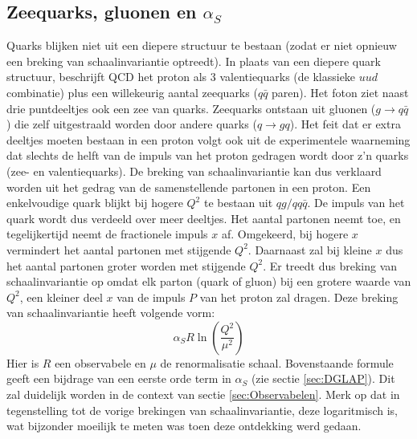 \documentclass[a4paper,11pt]{article}
\numberwithin{equation}{section} %
\begin{document}
  \subsection{Zeequarks, gluonen en $\alpha_S$}
Quarks blijken niet uit een diepere structuur te bestaan (zodat er niet opnieuw een breking van schaalinvariantie optreedt).
In plaats van een diepere quark structuur, beschrijft QCD het proton als 3 valentiequarks (de klassieke $u u d$ combinatie) plus een willekeurig aantal zeequarks ($q\bar{q}$ paren).
Het foton ziet naast drie puntdeeltjes ook een zee van quarks.
Zeequarks ontstaan uit gluonen ($g\rightarrow q\bar{q}$) die zelf uitgestraald worden door andere quarks ($q\rightarrow gq$).
Het feit dat er extra deeltjes moeten bestaan in een proton volgt ook uit de experimentele waarneming dat slechts de helft van de impuls van het proton gedragen wordt door z’n quarks (zee- en valentiequarks).
De breking van schaalinvariantie kan dus verklaard worden uit het gedrag van de samenstellende partonen in een proton.
Een enkelvoudige quark blijkt bij hogere $Q^2$ te bestaan uit $q g/q q\bar{q}$.
De impuls van het quark wordt dus verdeeld over meer deeltjes.
Het aantal partonen neemt toe, en tegelijkertijd neemt de fractionele impuls $x$ af.
Omgekeerd, bij hogere $x$ vermindert het aantal partonen met stijgende $Q^2$.
Daarnaast zal bij kleine $x$ dus het aantal partonen groter worden met stijgende $Q^2$.
Er treedt dus breking van schaalinvariantie op omdat elk parton (quark of gluon) bij een grotere waarde van $Q^2$, een kleiner deel  $x$ van de impuls $P$ van het proton zal dragen.
Deze breking van schaalinvariantie heeft volgende vorm:
\begin{equation}
\alpha_S R \ln{\left( \frac{Q^2}{\mu^2}\right)}
\end{equation}
Hier is $R$ een observabele en $\mu$ de renormalisatie schaal.
Bovenstaande formule geeft een bijdrage van een eerste orde term in $\alpha_S$ (zie sectie \ref{sec:DGLAP}).
Dit zal duidelijk worden in de context van sectie \ref{sec:Observabelen}.
Merk op dat in tegenstelling tot de vorige brekingen van schaalinvariantie, deze logaritmisch is, wat bijzonder moeilijk te meten was toen deze ontdekking werd gedaan.
\end{document}
